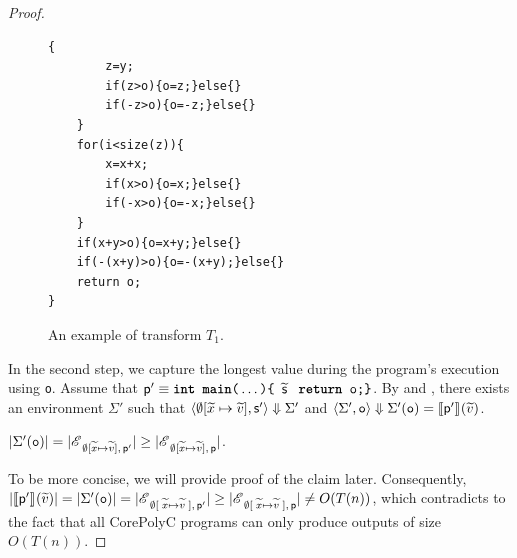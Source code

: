 \documentclass[runningheads]{llncs}
\begin{document}
\begin{proof}
\begin{figure}[t]
\begin{minipage}{0.45\linewidth}
\begin{lstlisting}[xleftmargin=-1em,xrightmargin=0em]
    {
        z=y;
        if(z>o){o=z;}else{}
        if(-z>o){o=-z;}else{}
    }
    for(i<size(z)){
        x=x+x;
        if(x>o){o=x;}else{}
        if(-x>o){o=-x;}else{}
    }
    if(x+y>o){o=x+y;}else{}
    if(-(x+y)>o){o=-(x+y);}else{}
    return o;
}
\end{lstlisting}
\end{minipage}
\caption{An example of transform $T_1$.}
\label{fig:T1}
\end{figure}
In the second step, we capture the longest value during the program's execution using \texttt{o}. Assume that $\mathsf{p}'\equiv \texttt{\textbf{int} \textbf{main}(}\dots\texttt{)\{ }\widetilde{\mathsf{s}}\;\texttt{ \textbf{return} o;\}}$.
By  and , there exists an environment $\Sigma'$ such that $\langle\emptyset[\widetilde{x}\mapsto\widetilde{v}],\mathsf{s}'\rangle\Downarrow{\Sigma'}$ and $\langle\Sigma',\texttt{o}\rangle\Downarrow{\Sigma'(\texttt{o})=\llbracket\mathsf{p}'\rrbracket_{}{(\widetilde{v})}}$.

\begin{claim}
    $\vert\Sigma'(\texttt{o})\vert=\vert\mathscr{E}_{\;\emptyset[\widetilde{x}\mapsto{\widetilde{v}}],\,\mathsf{p}'}\vert\ge\vert\mathscr{E}_{\;\emptyset[\widetilde{x}\mapsto{\widetilde{v}}],\,\mathsf{p}}\vert$.
\end{claim}


To be more concise, we will provide proof of the claim later.
Consequently, $\vert\llbracket\mathsf{p}'\rrbracket_{}{(\widetilde{v})}\vert=\vert\Sigma'(\texttt{o})\vert=\vert\mathscr{E}_{\;\emptyset[\;\widetilde{x}\mapsto{\widetilde{v}}\;],\,\mathsf{p}'}\vert\ge\vert\mathscr{E}_{\;\emptyset[\;\widetilde{x}\mapsto{\widetilde{v}}\;],\,\mathsf{p}}\vert\neq O(T(n))$, which contradicts to the fact that all CorePolyC programs can only produce outputs of size $O(T(n))$.


\end{proof}
\end{document}
